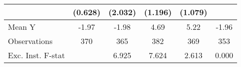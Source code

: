 {\begin{tabular}{l*{5}{c}}
            &     (0.628)         &     (2.032)         &     (1.196)         &     (1.079)         &                     \\
\midrule
Mean Y      &       -1.97         &       -1.98         &        4.69         &        5.22         &       -1.96         \\
Observations&         370         &         365         &         382         &         369         &         353         \\
Exc. Inst. F-stat&                     &       6.925         &       7.624         &       2.613         &       0.000         \\
\bottomrule
\end{tabular}
}
